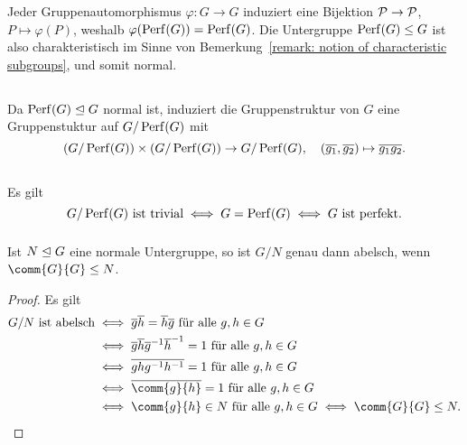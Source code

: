 \begin{remark}
  Jeder Gruppenautomorphismus $\varphi \colon G \to G$ induziert eine Bijektion $\mathcal{P} \to \mathcal{P}$, $P \mapsto \varphi(P)$, weshalb $\varphi(\operatorname{Perf}(G)) = \operatorname{Perf}(G)$.
  Die Untergruppe $\operatorname{Perf}(G) \leq G$ ist also charakteristisch im Sinne von Bemerkung~\ref{remark: notion of characteristic subgroups}, und somit normal.
\end{remark}





\subsection{}

Da $\operatorname{Perf}(G) \trianglelefteq G$ normal ist, induziert die Gruppenstruktur von $G$ eine Gruppenstuktur auf $G/\operatorname{Perf}(G)$ mit
\[
          (G/\operatorname{Perf}(G)) \times (G/\operatorname{Perf}(G))
  \to     G/\operatorname{Perf}(G),
  \quad   (\overline{g_1}, \overline{g_2})
  \mapsto \overline{g_1 g_2}.
\]





\subsection{}



\subsubsection{}

Es gilt
\[
        \text{$G/\operatorname{Perf}(G)$ ist trivial}
  \iff  G = \operatorname{Perf}(G)
  \iff  \text{$G$ ist perfekt}.
\]



\subsubsection{}

\begin{lemma}
  Ist $N \trianglelefteq G$ eine normale Untergruppe, so ist $G/N$ genau dann abelsch, wenn $\comm{G}{G} \subgroup N$.
\end{lemma}

\begin{proof}
  Es gilt
  \begin{align*}
          \text{$G/N$ ist abelsch}
    &\iff \text{$\class{g} \class{h} = \class{h} \class{g}$ für alle $g, h \in G$}
    \\
    &\iff \text{$\class{g} \class{h} \class{g}^{-1} \class{h}^{-1} = 1$ für alle $g, h \in G$}
    \\
    &\iff \text{$\class{g h g^{-1} h^{-1}} = 1$ für alle $g, h \in G$}
    \\
    &\iff \text{$\class{\comm{g}{h}} = 1$ für alle $g, h \in G$}
    \\
    &\iff \text{$\comm{g}{h} \in N$ für alle $g, h \in G$}
     \iff \comm{G}{G} \subgroup N.
  \qedhere
  \end{align*}
\end{proof}

